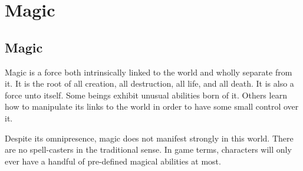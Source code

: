 \chapter{Magic}

\begin{multicols}{2}

\section{Magic}

Magic is a force both intrinsically linked to the world and wholly separate from it. It is 
the root of all creation, all destruction, all life, and all death. It is also a force unto 
itself. Some beings exhibit unusual abilities born of it. Others learn how to manipulate its 
links to the world in order to have some small control over it.

Despite its omnipresence, magic does not manifest strongly in this world. There are no 
spell-casters in the traditional sense. In game terms, characters will only ever have 
a handful of pre-defined magical abilities at most.

\end{multicols}
